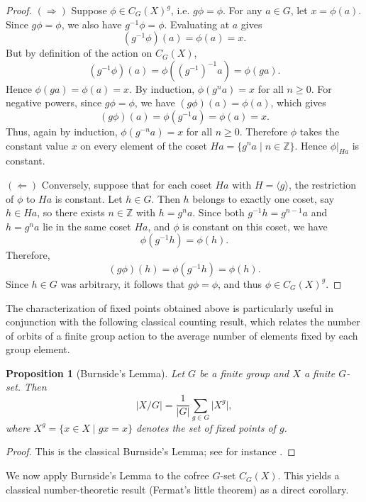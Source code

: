 \documentclass{amsart}
\newtheorem{proposition}{Proposition}
\begin{document}
\begin{proof}
$(\Rightarrow)$ Suppose $\phi \in C_G(X)^g$, i.e. $g \phi = \phi$. 
For any $a \in G$, let $x = \phi(a)$. Since $g \phi = \phi$, we also have $g^{-1} \phi = \phi$. Evaluating at $a$ gives
\[
(g^{-1}\phi)(a) = \phi(a) = x.
\]
But by definition of the action on $C_G(X)$,
\[
(g^{-1}\phi)(a) = \phi((g^{-1})^{-1}a) = \phi(g a).
\]
Hence $\phi(g a) = \phi(a) = x$. By induction, $\phi(g^n a) = x$ for all $n \ge 0$. 
For negative powers, since $g \phi = \phi$, we have $(g \phi)(a) = \phi(a)$, which gives
\[
(g \phi)(a) = \phi(g^{-1}a) = \phi(a) = x.
\]
Thus, again by induction, $\phi(g^{-n} a) = x$ for all $n \ge 0$. Therefore $\phi$ takes the constant value $x$ on every element of the coset $Ha = \{g^n a \mid n \in \mathbb{Z}\}$. Hence $\phi|_{Ha}$ is constant.

$(\Leftarrow)$ Conversely, suppose that for each coset $Ha$ with $H = \langle g \rangle$, the restriction of $\phi$ to $Ha$ is constant. 
Let $h \in G$. Then $h$ belongs to exactly one coset, say $h \in Ha$, so there exists $n \in \mathbb{Z}$ with $h = g^n a$. Since both $g^{-1}h = g^{n-1}a$ and $h = g^n a$ lie in the same coset $Ha$, and $\phi$ is constant on this coset, we have
\[
\phi(g^{-1} h) = \phi(h).
\]
Therefore,
\[
(g \phi)(h) = \phi(g^{-1} h) = \phi(h).
\]
Since $h \in G$ was arbitrary, it follows that $g \phi = \phi$, and thus $\phi \in C_G(X)^g$.
\end{proof}

The characterization of fixed points obtained above is particularly useful in conjunction with the following classical counting result, which relates the number of orbits of a finite group action to the average number of elements fixed by each group element.

\begin{proposition}[Burnside's Lemma]\label{prop:burnside}
Let $G$ be a finite group and $X$ a finite $G$-set. Then
\[
\lvert X/G \rvert = \frac{1}{\lvert G \rvert} \sum_{g \in G} \lvert X^g \rvert,
\]
where $X^g = \{ x \in X \mid g x = x \}$ denotes the set of fixed points of $g$.
\end{proposition}
\begin{proof}
This is the classical Burnside's Lemma; see for instance \cite{rotman2012introduction}.
\end{proof}

We now apply Burnside's Lemma to the cofree $G$-set $C_G(X)$. This yields a classical number-theoretic result (Fermat's little theorem) as a direct corollary.
\end{document}
